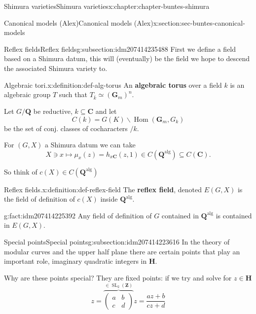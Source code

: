 \documentclass[oneside,10pt,]{book}
\newcommand{\terminology}[1]{\textbf{#1}}
\numberwithin{equation}{section}
\newcommand{\ZZ}{\mathbf{Z}}
\newcommand{\QQ}{\mathbf{Q}}
\newcommand{\CC}{\mathbf{C}}
\newcommand{\alg}{\mathrm{alg}}
\DeclareMathOperator{\Hom}{Hom}
\DeclareMathOperator{\SL}{SL}
\newcommand{\amp}{&}
\begin{document}
\begin{chapterptx}{Shimura varieties}{}{Shimura varieties}{}{}{x:chapter:chapter-buntes-shimura}
\begin{sectionptx}{Canonical models (Alex)}{}{Canonical models (Alex)}{}{}{x:section:sec-buntes-canonical-models}
%
\begin{subsectionptx}{Reflex fields}{}{Reflex fields}{}{}{g:subsection:idm207414235488}
First we define a field based on a Shimura datum, this will (eventually) be the field we hope to descend the associated Shimura variety to.%
\begin{definition}{Algebraic tori.}{x:definition:def-alg-torus}%
An \terminology{algebraic torus} over a field  \(k \) is an algebraic group \(T\) such that \(T_{\bar k} \simeq (\mathbf G_m)^n\).%
\end{definition}
Let \(G/\QQ\) be reductive, \(k \subseteq \CC\) and let%
\begin{equation*}
C(k) = G(K) \backslash \Hom(\mathbf G_m, G_k)
\end{equation*}
be the set of conj. classes of cocharacters \(/k\).%
\par
For \((G,X)\) a Shimura datum we can take%
\begin{equation*}
X \ni x \mapsto \mu_x(z) = h_{x\CC} (z,1) \in C(\QQ^\alg) \subseteq C(\CC)\text{.}
\end{equation*}
%
\par
So think of \(c(X) \in C(\QQ^\alg)\)%
\begin{definition}{Reflex fields.}{x:definition:def-reflex-field}%
The \terminology{reflex field}, denoted \(E(G,X)\) is the field of definition of \(c(X)\) inside \(\QQ^\alg\).%
\end{definition}
\begin{fact}{}{}{g:fact:idm207414225392}%
Any field of definition of \(G\) contained in \(\QQ^\alg\) is contained in \(E(G,X)\).%
\end{fact}
\end{subsectionptx}
%
%
\typeout{************************************************}
\typeout{************************************************}
%
\begin{subsectionptx}{Special points}{}{Special points}{}{}{g:subsection:idm207414223616}
In the theory of modular curves and the upper half plane there are certain points that play an important role, imaginary quadratic integers in \(\mathbf H\).%
\par
Why are these points special? They are fixed points: if we try and solve for \(z \in \mathbf H\)%
\begin{equation*}
z=  \overbrace{\begin{pmatrix} a\amp b \\ c \amp d\end{pmatrix}}^{\in \SL_2(\ZZ)} z = \frac{az + b}{cz+d}

\end{equation*}
\end{subsectionptx}
\end{sectionptx}
\end{chapterptx}
\end{document}
